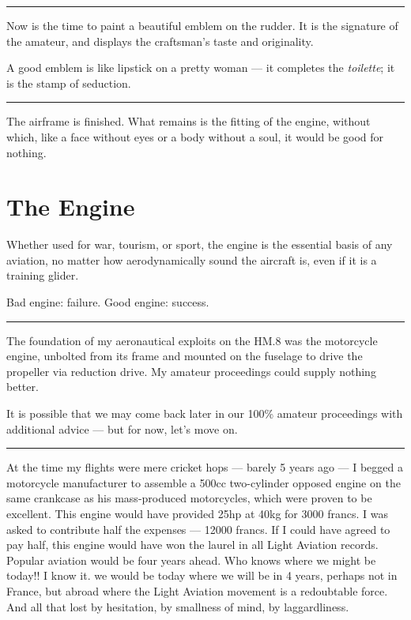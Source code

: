 \documentclass{book}
\newcommand*\sectline{
  \vspace{5pt}
  \begin{center}
    \rule{0.5\linewidth}{\linethickness}
  \end{center}
  \vspace{5pt}
}
\begin{document}
\sectline

Now is the time to paint a beautiful emblem on the rudder.  It is the
signature of the amateur, and displays the craftsman's taste and
originality.

A good emblem is like lipstick on a pretty woman --- it completes the
\textit{toilette}; it is the stamp of seduction.

\sectline

The airframe is finished.  What remains is the fitting of the engine,
without which, like a face without eyes or a body without a soul, it
would be good for nothing.

\chapter{The Engine}

Whether used for war, tourism, or sport, the engine is the essential
basis of any aviation, no matter how aerodynamically sound the
aircraft is, even if it is a training glider.

Bad engine: failure.  Good engine: success.

\sectline

The foundation of my aeronautical exploits on the HM.8 was the motorcycle engine, unbolted from its frame and mounted on the fuselage to drive the propeller via reduction drive.  My amateur proceedings could supply nothing better.

It is possible that we may come back later in our 100\% amateur
proceedings with additional advice --- but for now, let's move on.

\sectline

At the time my flights were mere cricket hops --- barely 5 years ago
--- I begged a motorcycle manufacturer to assemble a 500cc
two-cylinder opposed engine on the same crankcase as his mass-produced
motorcycles, which were proven to be excellent.  This engine would
have provided 25hp at 40kg for 3000 francs.  I was asked to contribute
half the expenses --- 12000 francs.  If I could have agreed to pay
half, this engine would have won the laurel in all Light Aviation
records.  Popular aviation would be four years ahead.  Who knows where
we might be today!!  I know it.  we would be today where we will be in
4 years, perhaps not in France, but abroad where the Light Aviation
movement is a redoubtable force.  And all that lost by hesitation, by
smallness of mind, by laggardliness.
\end{document}
